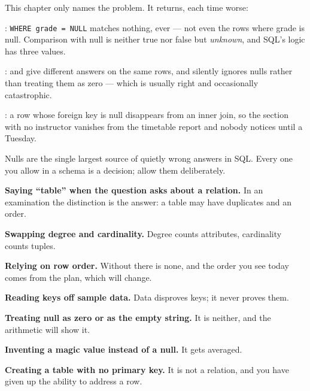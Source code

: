 \begin{alertbox}
This chapter only names the problem. It returns, each time worse:

\begin{tight}
  \item {}: \texttt{WHERE grade = NULL} matches nothing, ever ---
        not even the rows where grade is null. Comparison with null is neither
        true nor false but \emph{unknown}, and SQL's logic has three values.
  \item {}:  and  give
        different answers on the same rows, and  silently ignores
        nulls rather than treating them as zero --- which is usually right and
        occasionally catastrophic.
  \item {}: a row whose foreign key is null disappears from an inner
        join, so the section with no instructor vanishes from the timetable
        report and nobody notices until a Tuesday.
\end{tight}

\smallskip
Nulls are the single largest source of quietly wrong answers in SQL. Every one
you allow in a schema is a decision; allow them deliberately.
\end{alertbox}

\begin{pitfall}
\begin{tight}
  \item \textbf{Saying ``table'' when the question asks about a relation.} In
        an examination the distinction is the answer: a table may have
        duplicates and an order.
  \item \textbf{Swapping degree and cardinality.} Degree counts attributes,
        cardinality counts tuples.
  \item \textbf{Relying on row order.} Without  there is none,
        and the order you see today comes from the plan, which
         will change.
  \item \textbf{Reading keys off sample data.} Data disproves keys; it never
        proves them.
  \item \textbf{Treating null as zero or as the empty string.} It is neither,
        and the arithmetic will show it.
  \item \textbf{Inventing a magic value instead of a null.} It gets averaged.
  \item \textbf{Creating a table with no primary key.} It is not a relation,
        and you have given up the ability to address a row.
\end{tight}
\end{pitfall}

